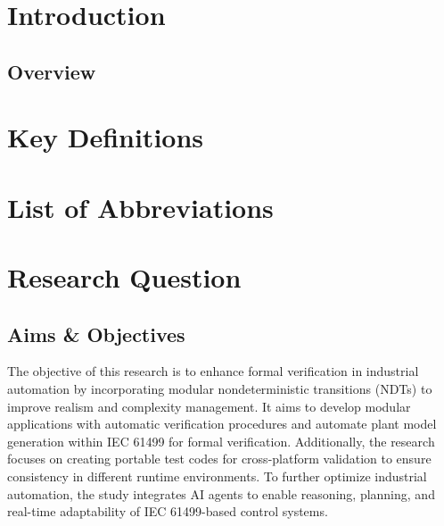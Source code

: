 
\section{Introduction}
\subsection{Overview}


\section{Key Definitions}


\section{List of Abbreviations}


\section{Research Question}
\subsection{Aims \& Objectives}
The objective of this research is to enhance formal verification in industrial automation by incorporating modular nondeterministic transitions (NDTs) to improve realism and complexity management. It aims to develop modular applications with automatic verification procedures and automate plant model generation within IEC 61499 for formal verification. Additionally, the research focuses on creating portable test codes for cross-platform validation to ensure consistency in different runtime environments. To further optimize industrial automation, the study integrates AI agents to enable reasoning, planning, and real-time adaptability of IEC 61499-based control systems.


